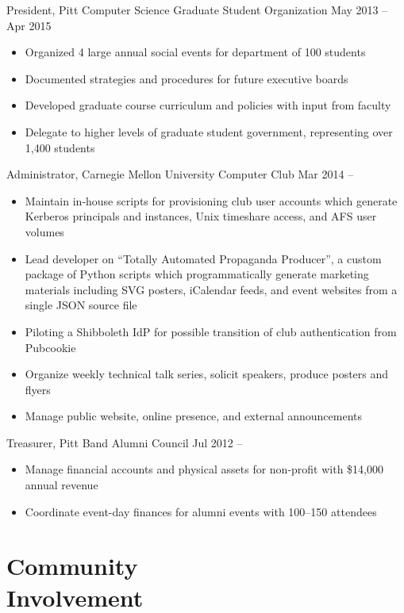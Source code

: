 \documentclass[11pt]{article}
\newcommand{\textdb}[1]{\fontseries{db}\selectfont#1\normalfont}
\newcommand{\present}{\phantom{Xxx 20XX}}
\begin{document}
\textdb{
President, Pitt Computer Science Graduate Student Organization
	\hfill May 2013 -- Apr 2015
}
\begin{itemize}
	\item Organized 4 large annual social events for department of 100 students
	\item Documented strategies and procedures for future executive boards
	\item Developed graduate course curriculum and policies with input from faculty
	\item Delegate to higher levels of graduate student government,
		representing over 1,400 students
\end{itemize}

\textdb{
Administrator, Carnegie Mellon University Computer Club
	\hfill Mar 2014 -- \present
}
\begin{itemize}
	\item Maintain in-house scripts for provisioning club user accounts
		which generate Kerberos principals and instances,
		Unix timeshare access, and AFS user volumes
	\item Lead developer on ``Totally Automated Propaganda Producer'',
		a custom package of Python scripts
		which programmatically generate marketing materials
		including SVG posters, iCalendar feeds, and event websites
		from a single JSON source file
	\item Piloting a Shibboleth IdP for possible transition
		of club authentication from Pubcookie
	\item Organize weekly technical talk series, solicit speakers, produce posters and flyers
	\item Manage public website, online presence, and external announcements
\end{itemize}

\textdb{
Treasurer, Pitt Band Alumni Council
	\hfill Jul 2012 -- \present
}
\begin{itemize}
	\item Manage financial accounts and physical assets
		for non-profit with \$14,000 annual revenue
	\item Coordinate event-day finances for alumni events with 100--150 attendees
\end{itemize}



\section{Community\\ Involvement}
\end{document}
